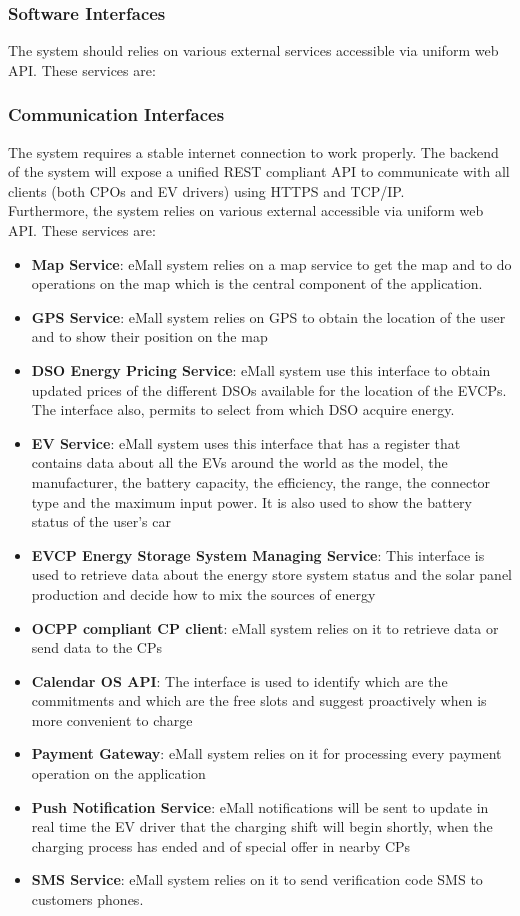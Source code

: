 \subsubsection{Software Interfaces}
The system should relies on various external services accessible via uniform web API. These services are:


\subsubsection{Communication Interfaces}
The system requires a stable internet connection to work properly.
The backend of the system will expose a unified REST compliant API to communicate
with all clients (both CPOs and EV drivers) using HTTPS and TCP/IP.
\\Furthermore, the system relies on various external accessible via uniform web API. These services are:
\begin{itemize}
    \item \textbf{Map Service}: eMall system relies on a map service to get the map and to do operations on the map which is the central component of the application.
    \item \textbf{GPS Service}: eMall system relies on GPS to obtain the location of the user and to show their position on the map
    \item \textbf{DSO Energy Pricing Service}: eMall system use this interface to obtain updated prices of the different DSOs available for the location of the EVCPs. The interface also, permits to select from which DSO acquire energy.
    \item \textbf{EV Service}: eMall system uses this interface that has a register that contains data about all the EVs around the world as the model, the manufacturer, the battery capacity, the efficiency, the range, the connector type and the maximum input power. It is also used to show the battery status of the user's car
    \item \textbf{EVCP Energy Storage System Managing Service}: This interface is used to retrieve data about the energy store system status and the solar panel production and decide how to mix the sources of energy
    \item \textbf{OCPP compliant CP client}: eMall system relies on it to retrieve data or send data to the CPs
    \item \textbf{Calendar OS API}: The interface is used to identify which are the commitments and which are the free slots and suggest proactively when is more convenient to charge
    \item \textbf{Payment Gateway}: eMall system relies on it for processing every payment operation on the application
    \item \textbf{Push Notification Service}: eMall notifications will be sent to update in real time the EV driver that the charging shift will begin shortly, when the charging process has ended and of special offer in nearby CPs
    \item \textbf{SMS Service}: eMall system relies on it to send verification code SMS to customers phones.
\end{itemize}


